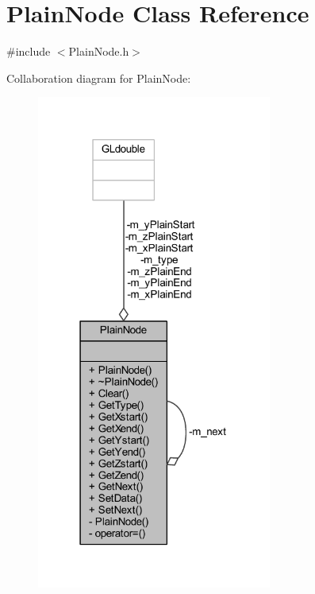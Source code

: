 \hypertarget{class_plain_node}{}\section{Plain\+Node Class Reference}
\label{class_plain_node}


{\ttfamily \#include $<$Plain\+Node.\+h$>$}



Collaboration diagram for Plain\+Node\+:
\nopagebreak
\begin{figure}[H]
\begin{center}
\leavevmode
\includegraphics[width=219pt]{class_plain_node__coll__graph}
\end{center}
\end{figure}
